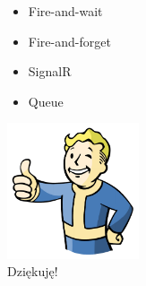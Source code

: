 \documentclass{beamer}
\begin{document}
\begin{frame}{}
	\begin{huge}
		\begin{itemize}[<+->]
			\item Fire-and-wait
			\item Fire-and-forget
			\item SignalR
			\item Queue
		\end{itemize}
	\end{huge}
\end{frame}

\begin{frame}{}
	\begin{center}
  		\includegraphics[height=4cm]{ok.png} \\
		\Huge{Dziękuję!}
	\end{center}
\end{frame}
\end{document}
